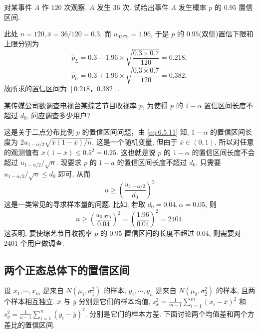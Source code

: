\begin{example}\label{exam:6.5.7}
对某事件 $A$ 作 $120$ 次观察, $A$ 发生 $36$ 次. 试给出事件 $A$ 发生概率 $p$ 的 $0.95$ 置信区间.
\end{example}\begin{solution}
此处 $n=120, \overline{x}=36 / 120=0.3$, 而 $u_{0.975}=1.96$, 于是 $p$ 的 $0.95$(双侧)置信下限和上限分别为
\[\hat{p}_{L}=0.3-1.96 \times \sqrt{\frac{0.3 \times 0.7}{120}}=0.218,\]
\[\hat{p}_{U}=0.3+1.96 \times \sqrt{\frac{0.3 \times 0.7}{120}}=0.382,\]
故所求的置信区间为 $[0.218，0.382]$.
\end{solution}

\begin{example}\label{exam:6.5.8}
某传媒公司欲调查电视台某综艺节目收视率 $p$, 为使得 $p$ 的 $1-\alpha$ 置信区间长度不超过 $d_0$, 问应调查多少用户?
\end{example}\begin{solution}
这是关于二点分布比例 $p$ 的置信区间问题，由 \eqref{eq:6.5.11} 知, $1-\alpha$ 的置信区间长度为 2$u_{1-\alpha / 2} \sqrt{\overline{x}(1-\overline{x}) / n}$, 这是一个随机变量, 但由于 $\overline{x} \in(0,1)$, 所以对任意的观测值有 $\overline{x}(1-\overline{x}) \leqslant 0.5^{2}=0.25$. 这也就是说 $p$ 的 $1-\alpha$ 的置信区间长度不会超过 $u_{1-\alpha / 2} / \sqrt{n}$. 现要求 $p$ 的 $1-a$ 的置信区间长度不超过 $d_0$, 只需要 $u_{1-\alpha/2} / \sqrt{n} \leqslant d_{0}$ 即可, 从而
\begin{equation}\label{eq:6.5.12}
n \geqslant\left(\frac{u_{1-\alpha / 2}}{d_{0}}\right)^{2}
\end{equation}
这是一类常见的寻求样本量的问题. 比如, 若取 $d_{0}=0.04, \alpha=0.05$, 则
\[n\geqslant\left(\frac{u_{0.975}}{0.04}\right)^{2}=\left(\frac{1.96}{0.04}\right)^{2}=2401.\]
这表明, 要使综艺节目收视率 $p$ 的 $0.95$ 置信区间的长度不超过 $0.04$, 则需要对 $2401$ 个用户做调查.
\end{solution}

\subsection{两个正态总体下的置信区间}\label{ssec:6.5.5}

设 $x_{1}, \cdots, x_{m}$ 是来自 $N\left(\mu_{1}, \sigma_{1}^{2}\right)$ 的样本, $y_{1}, \cdots, y_{n}$ 是来自 $N(\mu_2,\sigma_2^2)$ 的样本, 且两个样本相互独立. $\overline{x}$ 与 $\overline{y}$ 分别是它们的样本均值, $s_{x}^{2}=\frac{1}{m-1} \sum_{i=1}^{m}(x_{i}-\overline{x})^2$ 和 $s_{y}^{2}=\frac{1}{n-1} \sum_{i=1}^{n}\left(y_{i}-\overline{y}\right)^{2}$. 分别是它们的样本方差. 下面讨论两个均值差和两个方差比的置信区间.

